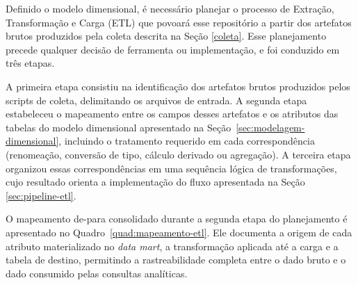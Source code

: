 Definido o modelo dimensional, é necessário planejar o processo de Extração, Transformação e Carga (ETL) que povoará esse repositório a partir dos artefatos brutos produzidos pela coleta descrita na Seção \ref{coleta}. Esse planejamento precede qualquer decisão de ferramenta ou implementação, e foi conduzido em três etapas.

A primeira etapa consistiu na identificação dos artefatos brutos produzidos pelos scripts de coleta, delimitando os arquivos de entrada. A segunda etapa estabeleceu o mapeamento entre os campos desses artefatos e os atributos das tabelas do modelo dimensional apresentado na Seção~\ref{sec:modelagem-dimensional}, incluindo o tratamento requerido em cada correspondência (renomeação, conversão de tipo, cálculo derivado ou agregação). A terceira etapa organizou essas correspondências em uma sequência lógica de transformações, cujo resultado orienta a implementação do fluxo apresentada na Seção \ref{sec:pipeline-etl}.

O mapeamento de-para consolidado durante a segunda etapa do planejamento é apresentado no Quadro~\ref{quad:mapeamento-etl}. Ele documenta a origem de cada atributo materializado no \textit{data mart}, a transformação aplicada até a carga e a tabela de destino, permitindo a rastreabilidade completa entre o dado bruto e o dado consumido pelas consultas analíticas.

